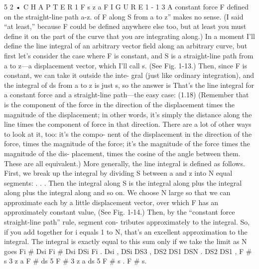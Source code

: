 \documentclass[10pt,oneside]{article}
\begin{document}
5 2 • C H A P T E R  1 F s z a F I G U R E 1 - 1 3 A constant force F defined on the straight-line path a-z. of F along S from a to z” makes no sense. (I said “at least,” because F could be defined anywhere else too, but at least you must define it on the part of the curve that you are integrating along.) In a moment I’ll define the line integral of an arbitrary vector field along an arbitrary curve, but first let’s consider the case where F is constant, and S is a straight-line path from a to z---a displacement vector, which I’ll call s. (See Fig. 1-13.) Then, since F is constant, we can take it outside the inte- gral (just like ordinary integration), and the integral of ds from a to z is just s, so the answer is That’s the line integral for a constant force and a straight-line path---the easy case: (1.18) (Remember that is the component of the force in the direction of the displacement times the magnitude of the displacement; in other words, it’s simply the distance along the line times the component of force in that direction. There are a lot of other ways to look at it, too: it’s the compo- nent of the displacement in the direction of the force, times the magnitude of the force; it’s the magnitude of the force times the magnitude of the dis- placement, times the cosine of the angle between them. These are all equivalent.) More generally, the line integral is defined as follows. First, we break up the integral by dividing S between a and z into N equal segments: . . . Then the integral along S is the integral along plus the integral along plus the integral along and so on. We choose N large so that we can approximate each by a little displacement vector, over which F has an approximately constant value, (See Fig. 1-14.) Then, by the “constant force straight-line path” rule, segment con- tributes approximately to the integral. So, if you add together for i equals 1 to N, that’s an excellent approximation to the integral. The integral is exactly equal to this sum only if we take the limit as N goes Fi \# Dsi Fi \# Dsi DSi Fi . Dsi , DSi DS3 , DS2 DS1 DSN . DS2 DS1 , F \# s 3 z a F \# ds 5 F \# 3 z a ds 5 F \# s . F \# s.\par
\end{document}
